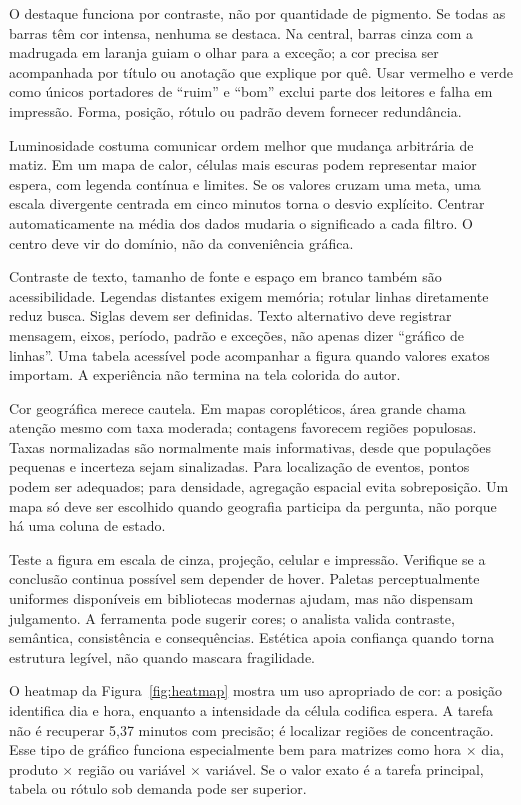 O destaque funciona por contraste, não por quantidade de pigmento. Se todas as barras têm cor intensa, nenhuma se destaca. Na central, barras cinza com a madrugada em laranja guiam o olhar para a exceção; a cor precisa ser acompanhada por título ou anotação que explique por quê. Usar vermelho e verde como únicos portadores de ``ruim'' e ``bom'' exclui parte dos leitores e falha em impressão. Forma, posição, rótulo ou padrão devem fornecer redundância.

Luminosidade costuma comunicar ordem melhor que mudança arbitrária de matiz. Em um mapa de calor, células mais escuras podem representar maior espera, com legenda contínua e limites. Se os valores cruzam uma meta, uma escala divergente centrada em cinco minutos torna o desvio explícito. Centrar automaticamente na média dos dados mudaria o significado a cada filtro. O centro deve vir do domínio, não da conveniência gráfica.

Contraste de texto, tamanho de fonte e espaço em branco também são acessibilidade. Legendas distantes exigem memória; rotular linhas diretamente reduz busca. Siglas devem ser definidas. Texto alternativo deve registrar mensagem, eixos, período, padrão e exceções, não apenas dizer ``gráfico de linhas''. Uma tabela acessível pode acompanhar a figura quando valores exatos importam. A experiência não termina na tela colorida do autor.

Cor geográfica merece cautela. Em mapas coropléticos, área grande chama atenção mesmo com taxa moderada; contagens favorecem regiões populosas. Taxas normalizadas são normalmente mais informativas, desde que populações pequenas e incerteza sejam sinalizadas. Para localização de eventos, pontos podem ser adequados; para densidade, agregação espacial evita sobreposição. Um mapa só deve ser escolhido quando geografia participa da pergunta, não porque há uma coluna de estado.

Teste a figura em escala de cinza, projeção, celular e impressão. Verifique se a conclusão continua possível sem depender de hover. Paletas perceptualmente uniformes disponíveis em bibliotecas modernas ajudam, mas não dispensam julgamento. A ferramenta pode sugerir cores; o analista valida contraste, semântica, consistência e consequências. Estética apoia confiança quando torna estrutura legível, não quando mascara fragilidade.



O heatmap da Figura~\ref{fig:heatmap} mostra um uso apropriado de cor: a posição identifica dia e hora, enquanto a intensidade da célula codifica espera. A tarefa não é recuperar 5,37 minutos com precisão; é localizar regiões de concentração. Esse tipo de gráfico funciona especialmente bem para matrizes como hora $\times$ dia, produto $\times$ região ou variável $\times$ variável. Se o valor exato é a tarefa principal, tabela ou rótulo sob demanda pode ser superior.


